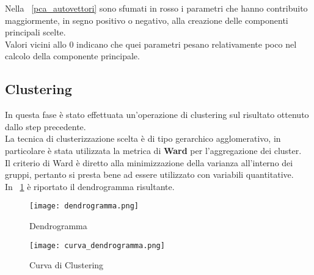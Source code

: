 Nella \figurename~\ref{pca_autovettori} sono sfumati in rosso i parametri che
hanno contribuito maggiormente, in segno positivo o negativo, alla creazione
delle componenti principali scelte.\\
Valori vicini allo 0 indicano che quei parametri pesano relativamente poco nel
calcolo della componente principale.\\

\clearpage
\subsection{Clustering}
In questa fase è stato effettuata un'operazione di clustering sul risultato
ottenuto dallo step precedente.\\
La tecnica di clusterizzazione scelta è di tipo gerarchico agglomerativo,
in particolare è stata utilizzata la metrica di \textbf{Ward} per l'aggregazione
dei cluster.\\
Il criterio di Ward è diretto alla minimizzazione della varianza all’interno dei gruppi,
pertanto si presta bene ad essere utilizzato con variabili quantitative.\\
In \figurename~\ref{pca_dendrogramma} è riportato il dendrogramma risultante.\\

\begin{figure}[!htbp]
	\texttt{[image: dendrogramma.png]}
  \caption{Dendrogramma}
  \label{pca_dendrogramma}
\end{figure}
\clearpage
\begin{figure}[!htbp]
	\texttt{[image: curva\_dendrogramma.png]}
  \caption{Curva di Clustering}
  \label{pca_curva_dendrogramma}
\end{figure}

